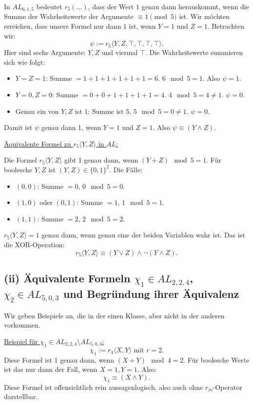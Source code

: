 \documentclass[12pt,a4paper]{article}
\begin{document}
In $AL_{6,1,5}$ bedeutet $r_5(\ldots)$, dass der Wert $1$ genau dann herauskommt, wenn die Summe der Wahrheitswerte der Argumente $\equiv 1 \pmod{5}$ ist. Wir möchten erreichen, dass unsere Formel nur dann $1$ ist, wenn $Y=1$ und $Z=1$. Betrachten wir:
\[
\psi := r_5\langle Y, Z, \top, \top, \top, \top \rangle.
\]
Hier sind sechs Argumente: $Y,Z$ und viermal $\top$. Die Wahrheitswerte summieren sich wie folgt:
\begin{itemize}
    \item $Y=Z=1$: Summe $=1+1+1+1+1+1=6$. $6 \mod 5 = 1$. Also $\psi=1$.
    \item $Y=0,Z=0$: Summe $=0+0+1+1+1+1=4$. $4 \mod 5=4 \neq1$. $\psi=0$.
    \item Genau ein von $Y,Z$ ist 1: Summe ist $5$, $5 \mod 5=0\neq1$. $\psi=0$.
\end{itemize}
Damit ist $\psi$ genau dann 1, wenn $Y=1$ und $Z=1$. Also $\psi \equiv (Y \land Z)$.

\underline{Äquivalente Formel zu $r_5\langle Y,Z\rangle$ in $AL$:}

Die Formel $r_5\langle Y,Z \rangle$ gibt 1 genau dann, wenn $(Y+Z) \mod 5 = 1$. Für boolesche $Y,Z$ ist $(Y,Z) \in \{0,1\}^2$. Die Fälle:
\begin{itemize}
    \item $(0,0)$: Summe $=0$, $0 \mod 5=0$.
    \item $(1,0)$ oder $(0,1)$: Summe $=1$, $1 \mod 5=1$.
    \item $(1,1)$: Summe $=2$, $2 \mod 5=2$.
\end{itemize}
$r_5\langle Y,Z\rangle=1$ genau dann, wenn genau eine der beiden Variablen wahr ist. Das ist die XOR-Operation:
\[
r_5\langle Y,Z\rangle \equiv (Y \lor Z) \land \neg(Y \land Z).
\]

\subsection*{(ii) Äquivalente Formeln $\chi_1 \in AL_{2,2,4}$, $\chi_2 \in AL_{5,0,3}$ und Begründung ihrer Äquivalenz}

Wir geben Beispiele an, die in der einen Klasse, aber nicht in der anderen vorkommen.

\underline{Beispiel für $\chi_1 \in AL_{2,2,4} \setminus AL_{5,0,3}$:}
\[
\chi_1 := r_4\langle X,Y \rangle \text{ mit } r=2.
\]
Diese Formel ist 1 genau dann, wenn $(X+Y)\mod4=2$. Für boolesche Werte ist das nur dann der Fall, wenn $X=1,Y=1$. Also:
\[
\chi_1 \equiv (X \land Y).
\]
Diese Formel ist offensichtlich rein aussagenlogisch, also auch ohne $r_m$-Operator darstellbar.
\end{document}
